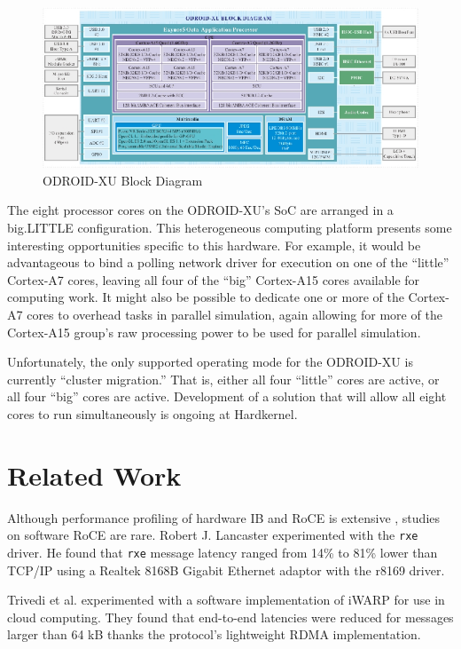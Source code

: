 \documentclass[11pt]{book}
\begin{document}
\begin{figure}[h]
\centering
\includegraphics[width=\textwidth]{odroid_xu_block_diagram}
\caption{ODROID-XU Block Diagram \cite{odroid-xu-board-detail}}
\label{odroid-xu-block-diagram}
\end{figure}


The eight processor cores on the ODROID-XU's SoC are arranged in a big.LITTLE
configuration. This heterogeneous computing platform presents some interesting
opportunities specific to this hardware. For example, it would be advantageous
to bind a polling network driver for execution on one of the ``little''
Cortex-A7 cores, leaving all four of the ``big'' Cortex-A15 cores available for
computing work. It might also be possible to dedicate one or more of the
Cortex-A7 cores to overhead tasks in parallel simulation, again allowing for
more of the Cortex-A15 group's raw processing power to be used for parallel
simulation.

Unfortunately, the only supported operating mode for the ODROID-XU is currently
``cluster migration.'' That is, either all four ``little'' cores are active, or
all four ``big'' cores are active. Development of a solution that will allow all
eight cores to run simultaneously is ongoing at Hardkernel.

\section{\textbf{Related Work}}



Although performance profiling of hardware IB and RoCE is extensive
\cite{subamaroni-09} \cite{vienne-12}, studies on software RoCE are
rare. Robert J. Lancaster \cite{lancaster-10} experimented with the \verb;rxe;
driver. He found that \verb;rxe; message latency ranged from 14\% to 81\% lower
than TCP/IP using a Realtek 8168B Gigabit Ethernet adaptor with the r8169
driver.

Trivedi et al. \cite{trivedi-11} experimented with a software implementation of
iWARP for use in cloud computing. They found that end-to-end latencies were
reduced for messages larger than 64 kB thanks the protocol's lightweight RDMA
implementation.
\end{document}
